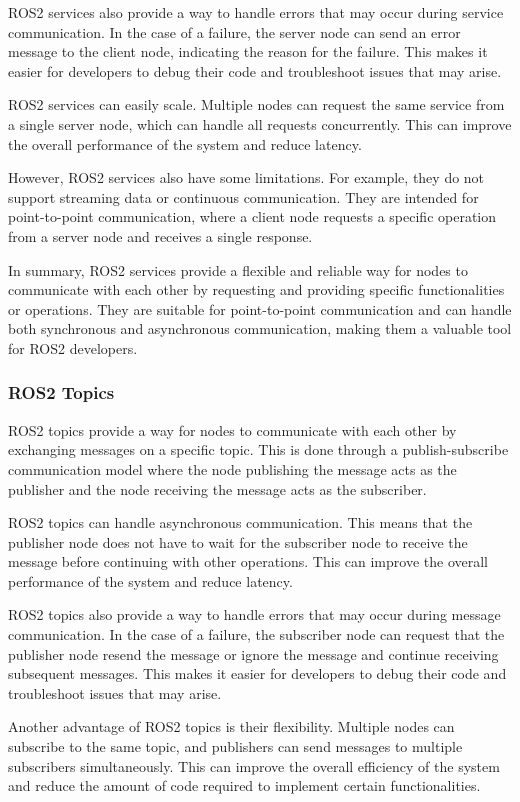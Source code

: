 \documentclass[12pt,oneside]{article}
\begin{document}
ROS2 services also provide a way to handle errors that may occur during service communication. In the case of a failure, the server node can send an error message to the client node, indicating the reason for the failure. This makes it easier for developers to debug their code and troubleshoot issues that may arise.

ROS2 services can easily scale. Multiple nodes can request the same service from a single server node, which can handle all requests concurrently. This can improve the overall performance of the system and reduce latency.

However, ROS2 services also have some limitations. For example, they do not support streaming data or continuous communication. They are intended for point-to-point communication, where a client node requests a specific operation from a server node and receives a single response.

In summary, ROS2 services provide a flexible and reliable way for nodes to communicate with each other by requesting and providing specific functionalities or operations. They are suitable for point-to-point communication and can handle both synchronous and asynchronous communication, making them a valuable tool for ROS2 developers.

\subsubsection{ROS2 Topics}\label{ros2-topics}
ROS2 topics provide a way for nodes to communicate with each other by exchanging messages on a specific topic. This is done through a publish-subscribe communication model where the node publishing the message acts as the publisher and the node receiving the message acts as the subscriber.

ROS2 topics can handle asynchronous communication. This means that the publisher node does not have to wait for the subscriber node to receive the message before continuing with other operations. This can improve the overall performance of the system and reduce latency.

ROS2 topics also provide a way to handle errors that may occur during message communication. In the case of a failure, the subscriber node can request that the publisher node resend the message or ignore the message and continue receiving subsequent messages. This makes it easier for developers to debug their code and troubleshoot issues that may arise.

Another advantage of ROS2 topics is their flexibility. Multiple nodes can subscribe to the same topic, and publishers can send messages to multiple subscribers simultaneously. This can improve the overall efficiency of the system and reduce the amount of code required to implement certain functionalities.
\end{document}
